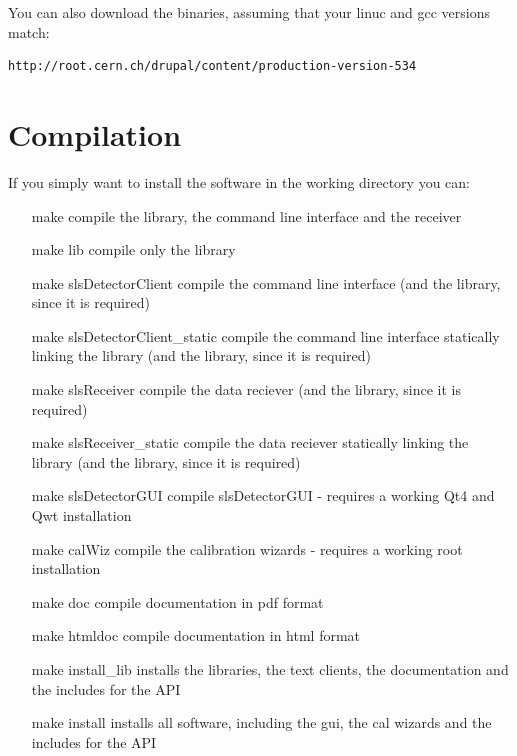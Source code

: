 \documentclass{article}
\begin{document}
You can also download the binaries, assuming that your linuc and gcc versions match:
\begin{verbatim}
http://root.cern.ch/drupal/content/production-version-534
\end{verbatim}


\section{Compilation} 



If you simply want to install the software in the working directory you can:
\begin{itemize}
\item[make] compile the library, the command line interface and the receiver 

\item[make lib]     	compile only the library 

\item[make slsDetectorClient] compile the command line interface (and the library, since it is required)

\item[make slsDetectorClient\_static] compile the command line interface statically linking the library (and the library, since it is required)

\item[make slsReceiver] compile the data reciever (and the library, since it is required)

\item[make slsReceiver\_static] compile the data reciever statically linking the library (and the library, since it is required)

\item[make slsDetectorGUI]  compile slsDetectorGUI - requires a working Qt4 and Qwt installation

\item[make calWiz] compile the calibration wizards - requires a working root installation

\item[make doc] compile documentation in pdf format

\item[make htmldoc] compile documentation in html format

\item[make install\_lib]        installs the libraries, the text clients, the documentation and the includes for the API

\item[make install]            installs all software, including the gui, the cal wizards and the includes for the API


\end{itemize}
\end{document}
